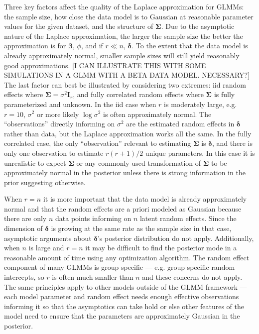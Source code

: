 \documentclass[12pt]{article}
\begin{document}
Three key factors affect the quality of the Laplace approximation for GLMMs: the sample size, how close the data model is to Gaussian at reasonable parameter values for the given dataset, and the structure of $\bm{\Sigma}$. Due to the asymptotic nature of the Laplace approximation, the larger the sample size the better the approximation is for $\bm{\beta}$, $\phi$, and if $r\ll n$, $\bm{\delta}$. To the extent that the data model is already approximately normal, smaller sample sizes will still yield reasonably good approximations. [I CAN ILLUSTRATE THIS WITH SOME SIMULATIONS IN A GLMM WITH A BETA DATA MODEL. NECESSARY?] The last factor can best be illustrated by considering two extremes: iid random effects where $\bm{\Sigma} = \sigma^2\bm{I}_r$, and fully correlated random effects where $\bm{\Sigma}$ is fully parameterized and unknown. In the iid case when $r$ is moderately large, e.g. $r=10$, $\sigma^2$ or more likely $\log\sigma^2$ is often approximately normal. The ``observations'' directly informing on $\sigma^2$ are the estimated random effects in $\bm{\delta}$ rather than data, but the Laplace approximation works all the same. In the fully correlated case, the only ``observation'' relevant to estimating $\bm{\Sigma}$ is $\bm{\delta}$, and there is only one observation to estimate $r(r+1)/2$ unique parameters. In this case it is unrealistic to expect $\bm{\Sigma}$ or any commonly used transformation of $\bm{\Sigma}$ to be approximately normal in the posterior unless there is strong information in the prior suggesting otherwise. 

When $r=n$ it is more important that the data model is already approximately normal and that the random effects are a priori modeled as Gaussian because there are only $n$ data points informing on $n$ latent random effects. Since the dimension of $\bm{\delta}$ is growing at the same rate as the sample size in that case, asymptotic arguments about $\bm{\delta}$'s posterior distribution do not apply. Additionally, when $n$ is large and $r=n$ it may be difficult to find the posterior mode in a reasonable amount of time using any optimization algorithm. The random effect component of many GLMMs is group specific --- e.g. group specific random intercepts, so $r$ is often much smaller than $n$ and these concerns do not apply. The same principles apply to other models outside of the GLMM framework --- each model parameter and random effect needs enough effective observations informing it so that the asymptotics can take hold or else other features of the model need to ensure that the parameters are approximately Gaussian in the posterior.
\end{document}
